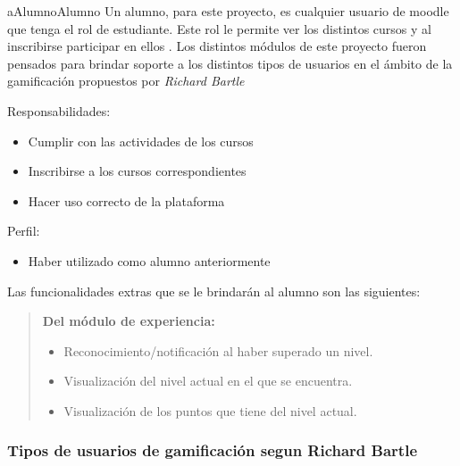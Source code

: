     \begin{actor}{aAlumno}{Alumno}{%
    Un alumno, para este proyecto, es cualquier usuario de moodle que tenga el rol de
    estudiante. Este rol le permite ver los distintos cursos y al inscribirse participar
    en ellos \cite{MoodleRol}. Los distintos módulos de este proyecto fueron pensados para
    brindar soporte a los distintos tipos de usuarios en el ámbito de la gamificación
    propuestos por {\it Richard Bartle} \cite{TiposDeUsuario}\\}

    \item[Responsabilidades:] \hfill
        \begin{itemize}
        \item Cumplir con las actividades de los cursos
        \item Inscribirse a los cursos correspondientes
        \item Hacer uso correcto de la plataforma
        \end{itemize}

    \item[Perfil:] \hfill
        \begin{itemize}
        \item Haber utilizado como alumno anteriormente
        \end{itemize}
    \end{actor}

    \noindent
    Las funcionalidades extras que se le brindarán al alumno son las siguientes:

    \begin{quote}
    {\bf Del módulo de experiencia:}
        \begin{itemize}
        \item Reconocimiento/notificación al haber superado un nivel.
        \item Visualización del nivel actual en el que se encuentra.
        \item Visualización de los puntos que tiene del nivel actual.
        \end{itemize}
    \end{quote}

    \subsubsection{Tipos de usuarios de gamificación segun Richard Bartle}

